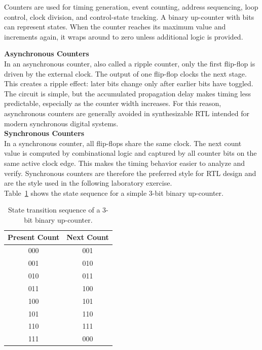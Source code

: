 \noindent Counters are used for timing generation, event counting, address sequencing, loop control,
clock division, and control-state tracking. A binary up-counter with  bits can
represent  states. When the counter reaches its maximum value and increments again,
it wraps around to zero unless additional logic is provided.

\noindent \textbf{Asynchronous Counters}\\
In an asynchronous counter, also called a ripple counter, only the first flip-flop is driven by the
external clock. The output of one flip-flop clocks the next stage. This creates a ripple effect:
later bits change only after earlier bits have toggled. The circuit is simple, but the accumulated
propagation delay makes timing less predictable, especially as the counter width increases. For this
reason, asynchronous counters are generally avoided in synthesizable RTL intended for modern
synchronous digital systems.\\

\noindent \textbf{Synchronous Counters}\\
In a synchronous counter, all flip-flops share the same clock. The next count value is computed by
combinational logic and captured by all counter bits on the same active clock edge. This makes the
timing behavior easier to analyze and verify. Synchronous counters are therefore the preferred style
for RTL design and are the style used in the following laboratory exercise.\\

\noindent Table~\ref{tab:counter_3bit_sequence} shows the state sequence for a simple 3-bit binary
up-counter.

\begin{table}[H]
\centering
\renewcommand{\arraystretch}{1.2}
\begin{tabular}{|c|c|}
\hline
\textbf{Present Count} & \textbf{Next Count} \\
\hline
000 & 001 \\
\hline
001 & 010 \\
\hline
010 & 011 \\
\hline
011 & 100 \\
\hline
100 & 101 \\
\hline
101 & 110 \\
\hline
110 & 111 \\
\hline
111 & 000 \\
\hline
\end{tabular}
\caption{State transition sequence of a 3-bit binary up-counter.}
\label{tab:counter_3bit_sequence}
\end{table}

